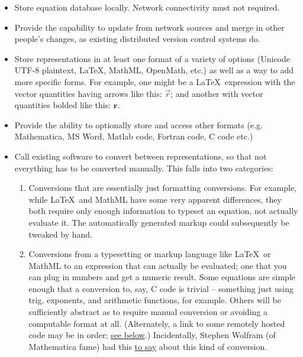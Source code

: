 \documentclass[12pt,letterpaper]{article}
\begin{document}
\begin{itemize}
\item Store equation database locally. Network connectivity must not required.
\item Provide the capability to update from network sources and merge in other people's changes,
      as existing distributed version control systems do.
\item Store representations in at least one format of a variety of options
      (Unicode UTF-8 plaintext, \LaTeX, MathML, OpenMath, etc.)
      as well as a way to add more specific forms.
      For example, one might be a \LaTeX\ expression with the vector quantities having arrows like this:
      $\vec{r}$;
      and another with vector quantities bolded like this:
      $\mathbf{r}$.
\item Provide the ability to optionally store and access other formats
      (e.g. Mathematica, MS Word, Matlab code, Fortran code, C code etc.)
\item Call existing software to convert between representations,
      so that not everything has to be converted manually.
      This falls into two categories:
      \begin{enumerate}
      \item Conversions that are essentially just formatting conversions.
            For example, while \LaTeX\ and MathML have some very apparent differences,
            they both require only enough information to typeset an equation,
            not actually evaluate it.
            The automatically generated markup could subsequently be tweaked by hand.
      \item Conversions from a typesetting or markup language like \LaTeX\ or MathML to an expression that can actually be evaluated;
            one that you can plug in numbers and get a numeric result.
            Some equations are simple enough that a conversion to, say, C code is trivial
            -- something just using trig, exponents, and arithmetic functions, for example.
            Others will be sufficiently abstract as to require manual conversion or avoiding a computable format at all.
            (Alternately, a link to some remotely hosted code may be in order;
            \hyperref[itm:linking]{see below}.)
            Incidentally, Stephen Wolfram (of Mathematica fame) had this
            \href{http://www.stephenwolfram.com/publications/recent/mathml/mathml1.html}{to say}
            about this kind of conversion.
                \begin{quote}

\end{quote}
\end{enumerate}
\end{itemize}
\end{document}

